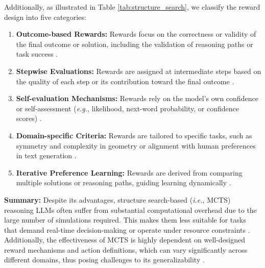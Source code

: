 Additionally, as illustrated in Table \ref{tab:structure_search}, we classify the reward design into five categories:
\begin{enumerate}[itemindent=0em]
\item \textbf{Outcome-based Rewards:} Rewards focus on the correctness or validity of the final outcome or solution, including the validation of reasoning paths or task success \cite{DBLP:journals/corr/abs-2405-00451, DBLP:journals/corr/abs-2411-15645, DBLP:journals/corr/abs-2412-10673}.

\item \textbf{Stepwise Evaluations:} Rewards are assigned at intermediate steps based on the quality of each step or its contribution toward the final outcome \cite{hao2023reasoning, DBLP:journals/corr/abs-2411-11053, wan2024alphazero}.

\item \textbf{Self-evaluation Mechanisms:} Rewards rely on the model’s own confidence or self-assessment (\emph{e.g.}, likelihood, next-word probability, or confidence scores) \cite{DBLP:journals/corr/abs-2412-11605, DBLP:journals/corr/abs-2410-16033, DBLP:journals/corr/abs-2405-16265}.

\item \textbf{Domain-specific Criteria:} Rewards are tailored to specific tasks, such as symmetry and complexity in geometry or alignment with human preferences in text generation \cite{DBLP:journals/corr/abs-2412-10673, DBLP:conf/nips/ZhaoLH23, DBLP:journals/corr/abs-2411-04459}.

\item \textbf{Iterative Preference Learning:} Rewards are derived from comparing multiple solutions or reasoning paths, guiding learning dynamically \cite{DBLP:journals/corr/abs-2410-02884, Marco_o1, DBLP:journals/corr/abs-2406-03816}.

\end{enumerate}

\noindent\textbf{Summary:} Despite its advantages, structure search-based (\emph{i.e.}, MCTS) reasoning LLMs often suffer from substantial computational overhead due to the large number of simulations required. This makes them less suitable for tasks that demand real-time decision-making or operate under resource constraints \cite{DBLP:journals/corr/abs-2309-03224}. 
Additionally, the effectiveness of MCTS is highly dependent on well-designed reward mechanisms and action definitions, which can vary significantly across different domains, thus posing challenges to its generalizability \cite{DBLP:journals/apin/KemmerlingLS24}.

